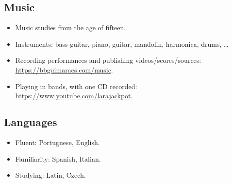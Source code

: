 \subsection*{Music}

\begin{itemize}
    \item Music studies from the age of fifteen.
    \item
        Instruments: bass guitar, piano, guitar, mandolin, harmonica, drums, …
    \item
        Recording performances and publishing videos/scores/sources:
        \url{https://bbguimaraes.com/music}.
    \item
        Playing in bands, with one CD recorded:
        \url{https://www.youtube.com/larajackpot}.
\end{itemize}

\subsection*{Languages}

\begin{itemize}
    \item Fluent: Portuguese, English.
    \item Familiarity: Spanish, Italian.
    \item Studying: Latin, Czech.
\end{itemize}
